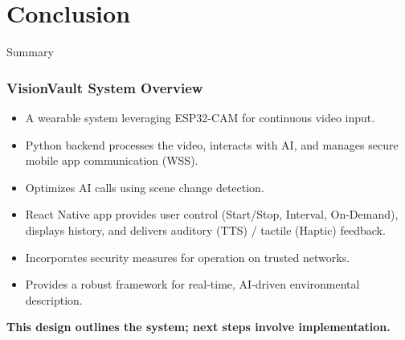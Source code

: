 \documentclass{beamer}
\begin{document}
\section{Conclusion}

\begin{frame}{Summary}
    \frametitle{VisionVault System Overview}
    \begin{itemize}
        \item A wearable system leveraging ESP32-CAM for continuous video input.
        \item Python backend processes the video, interacts with AI, and manages secure mobile app communication (WSS).
        \item Optimizes AI calls using scene change detection.
        \item React Native app provides user control (Start/Stop, Interval, On-Demand), displays history, and delivers auditory (TTS) / tactile (Haptic) feedback.
        \item Incorporates security measures for operation on trusted networks.
        \item Provides a robust framework for real-time, AI-driven environmental description.
    \end{itemize}
     \vspace{1em}
     \textbf{This design outlines the system; next steps involve implementation.}
\end{frame}
\end{document}
